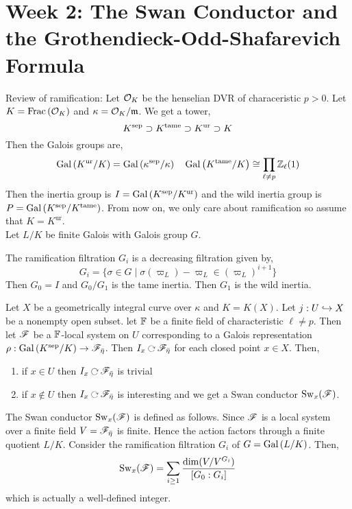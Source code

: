 \documentclass[12pt]{article}
\begin{document}
\newcommand{\tame}{\mathrm{tame}}
\newcommand{\ur}{\mathrm{ur}}
\newcommand{\Sw}{\mathrm{Sw}}

\section{Week 2: The Swan Conductor and the Grothendieck-Odd-Shafarevich Formula}

Review of ramification: Let $\mathcal{O}_{K}$ be the henselian DVR of characeristic $p > 0$. Let $K = \mathrm{Frac}\left(\mathcal{O}_{K}\right)$ and $\kappa = \mathcal{O}_{K} / \mathfrak{m}$. We get a tower,
\[ K^\sep \supset K^{\tame} \supset K^{\ur} \supset K \] 
Then the Galois groups are,
\[ \Gal{K^{\ur} / K} = \Gal{\kappa^\sep / \kappa} \quad \Gal{K^{\tame} / K} \cong \prod_{\ell \neq p} \Z_{\ell}(1) \]
Then the inertia group is $I = \Gal{K^\sep / K^\ur}$ and the wild inertia group is $P = \Gal{K^\sep / K^\tame}$. From now on, we only care about ramification so assume that $K = K^{\ur}$. 
\bigskip\\
Let $L/K$ be finite Galois with Galois group $G$. 

\begin{defn}
The ramification filtration $G_i$ is a decreasing filtration given by,
\[ G_i = \{ \sigma \in G \mid \sigma(\varpi_L) - \varpi_L \in (\varpi_L)^{i+1} \} \]
Then $G_0 = I$ and $G_0 / G_1$ is the tame inertia. Then $G_1$ is the wild inertia.
\end{defn}

\begin{rmk}
Let $X$ be a geometrically integral curve over $\kappa$ and $K = K(X)$. Let $j : U \hookrightarrow X$ be a nonempty open subset. let $\mathbb{F}$ be a finite field of characteristic $\ell \neq p$. Then let $\mathscr{F}$ be a $\mathbb{F}$-local system on $U$ corresponding to a Galois representation $\rho : \mathrm{Gal}\left( K^{\mathrm{sep}} / K \right) \to \mathscr{F}_{\bar{\eta}}$. Then $I_x \acts \F_{\bar{\eta}}$ for each closed point $x \in X$. Then,
\begin{enumerate}
\item if $x \in U$ then $I_x \acts \F_{\bar{\eta}}$ is trivial
\item if $x \notin U$ then $I_x \acts \F_{\bar{\eta}}$ is interesting and we get a Swan conductor $\Sw_x(\F)$.
\end{enumerate}
\end{rmk}

\begin{defn}
The Swan conductor $\Sw_x(\F)$ is defined as follows. Since $\mathscr{F}$ is a local system over a finite field $V = \mathscr{F}_{\bar{\eta}}$ is finite. Hence the action factors through a finite quotient $L/K$. Consider the ramification filtration $G_i$ of $G = \mathrm{Gal}\left( L/K \right)$. Then,
\[ \Sw_x(\F) = \sum_{i \ge 1} \frac{\dim(V/V^{G_i})}{[G_0 : G_i]} \]
which is actually a well-defined integer.
\end{defn}
\end{document}

